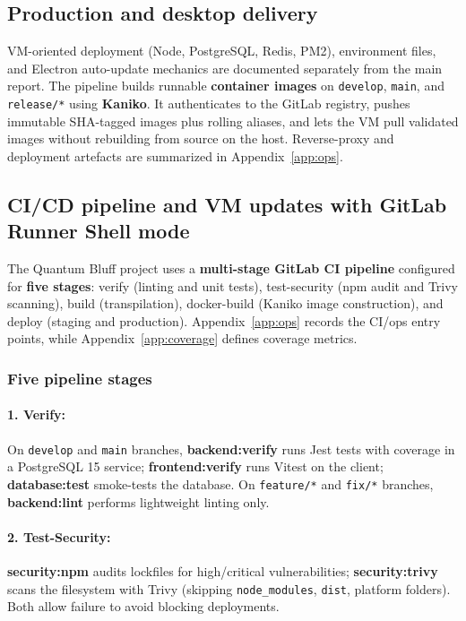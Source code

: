 \documentclass[11pt,a4paper]{article}
\begin{document}
\subsection{Production and desktop delivery}

VM-oriented deployment (Node, PostgreSQL, Redis, PM2), environment files, and Electron auto-update mechanics are documented separately from the main report. The pipeline builds runnable \textbf{container images} on \texttt{develop}, \texttt{main}, and \texttt{release/*} using \textbf{Kaniko}. It authenticates to the GitLab registry, pushes immutable SHA-tagged images plus rolling aliases, and lets the VM pull validated images without rebuilding from source on the host. Reverse-proxy and deployment artefacts are summarized in Appendix~\ref{app:ops}.

\subsection{CI/CD pipeline and VM updates with GitLab Runner Shell mode}

The Quantum Bluff project uses a \textbf{multi-stage GitLab CI pipeline} configured for \textbf{five stages}: verify (linting and unit tests), test-security (npm audit and Trivy scanning), build (transpilation), docker-build (Kaniko image construction), and deploy (staging and production). Appendix~\ref{app:ops} records the CI/ops entry points, while Appendix~\ref{app:coverage} defines coverage metrics.

\subsubsection{Five pipeline stages}

\paragraph{1. Verify:} On \texttt{develop} and \texttt{main} branches, \textbf{backend:verify} runs Jest tests with coverage in a PostgreSQL 15 service; \textbf{frontend:verify} runs Vitest on the client; \textbf{database:test} smoke-tests the database. On \texttt{feature/*} and \texttt{fix/*} branches, \textbf{backend:lint} performs lightweight linting only.

\paragraph{2. Test-Security:} \textbf{security:npm} audits lockfiles for high/critical vulnerabilities; \textbf{security:trivy} scans the filesystem with Trivy (skipping \texttt{node\_modules}, \texttt{dist}, platform folders). Both allow failure to avoid blocking deployments.
\end{document}

